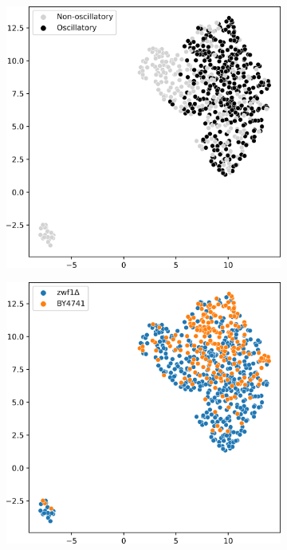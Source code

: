 \begin{figure}
  \centering
  \begin{subfigure}[t]{0.5\textwidth}
  \centering
    \includegraphics[width=\linewidth]{umap_single_is20016_firsthalf_2.png}
    \caption{
    }
    \label{fig:umap-firsthalf-osc}
  \end{subfigure}%
  \begin{subfigure}[t]{0.5\textwidth}
  \centering
    \includegraphics[width=\linewidth]{umap_single_is20016_firsthalf_1.png}
    \caption{
    }
    \label{fig:umap-firsthalf-strain}
  \end{subfigure}


\end{figure}
